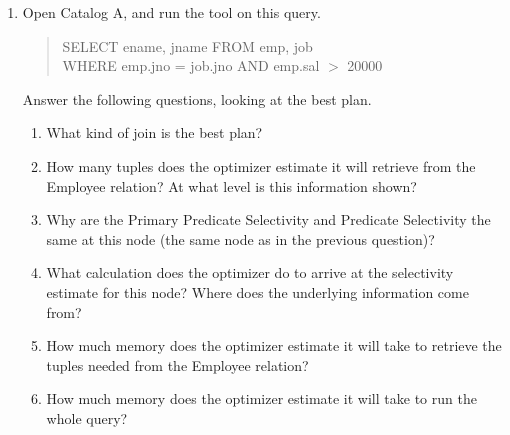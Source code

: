 \begin{enumerate}
\item

Open Catalog A, and run the tool on this query. 
\begin{quote}
        SELECT ename, jname FROM emp, job\\
        WHERE emp.jno = job.jno AND emp.sal $>$ 20000
\end{quote}

Answer the following questions, looking at the best plan.
\begin{enumerate}
\item
What kind of join is the best plan?
\item
How many tuples does the optimizer estimate it will retrieve from the
Employee relation?  At what level is this information shown?
\item
Why are the Primary Predicate Selectivity and Predicate Selectivity the
same at this node (the same node as in the previous question)?
\item
What calculation does the optimizer do to arrive at the selectivity
estimate for this node?  Where does the underlying information come from?
\item
How much memory does the optimizer estimate it will take to retrieve the
tuples needed from the Employee relation?
\item
How much memory does the optimizer estimate it will take to run the
whole query?
\end{enumerate}


\end{enumerate}
